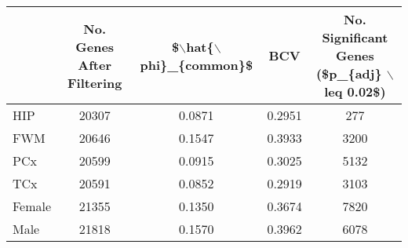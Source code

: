 \begin{table}[ht]
\centering
\begin{tabular}{l|c|c|c|c}
  \hline
 & No. Genes After Filtering & \$$\backslash$hat\{$\backslash$phi\}\_\{common\}\$ & BCV & No. Significant Genes (\$p\_\{adj\} $\backslash$leq 0.02\$) \\ 
  \hline
HIP & 20307 & 0.0871 & 0.2951 & 277 \\ 
  FWM & 20646 & 0.1547 & 0.3933 & 3200 \\ 
  PCx & 20599 & 0.0915 & 0.3025 & 5132 \\ 
  TCx & 20591 & 0.0852 & 0.2919 & 3103 \\ 
  Female & 21355 & 0.1350 & 0.3674 & 7820 \\ 
  Male & 21818 & 0.1570 & 0.3962 & 6078 \\ 
   \hline
\end{tabular}
\end{table}
